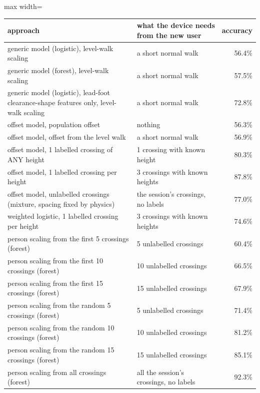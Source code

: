 \begin{adjustbox}{max width=\textwidth}
{\footnotesize
\begin{tabular}{p{7.6cm}p{4.4cm}r}
\toprule
\textbf{approach} & \textbf{what the device needs from the new user} & \textbf{accuracy} \\
\midrule
generic model (logistic), level-walk scaling & a short normal walk & 56.4\% \\
generic model (forest), level-walk scaling & a short normal walk & 57.5\% \\
generic model (logistic), lead-foot clearance-shape features only, level-walk scaling & a short normal walk & 72.8\% \\
offset model, population offset & nothing & 56.3\% \\
offset model, offset from the level walk & a short normal walk & 56.9\% \\
offset model, 1 labelled crossing of ANY height & 1 crossing with known height & 80.3\% \\
offset model, 1 labelled crossing per height & 3 crossings with known heights & 87.8\% \\
offset model, unlabelled crossings (mixture, spacing fixed by physics) & the session's crossings, no labels & 77.0\% \\
weighted logistic, 1 labelled crossing per height & 3 crossings with known heights & 74.6\% \\
person scaling from the first 5 crossings (forest) & 5 unlabelled crossings & 60.4\% \\
person scaling from the first 10 crossings (forest) & 10 unlabelled crossings & 66.5\% \\
person scaling from the first 15 crossings (forest) & 15 unlabelled crossings & 67.9\% \\
person scaling from the random 5 crossings (forest) & 5 unlabelled crossings & 71.4\% \\
person scaling from the random 10 crossings (forest) & 10 unlabelled crossings & 81.2\% \\
person scaling from the random 15 crossings (forest) & 15 unlabelled crossings & 85.1\% \\
person scaling from all crossings (forest) & all the session's crossings, no labels & 92.3\% \\
\bottomrule
\end{tabular}
}
\end{adjustbox}
